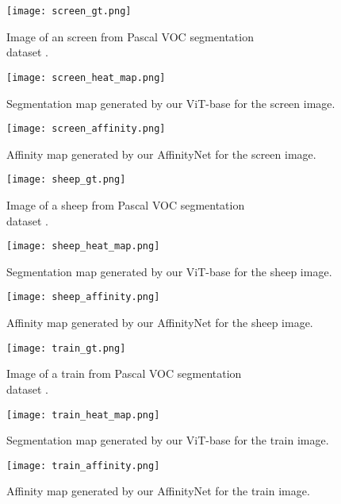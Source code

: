 \documentclass{article}
\begin{document}
\begin{figure}[H]
  \texttt{[image: screen\_gt.png]}
  \caption{Image of an screen from Pascal VOC segmentation \\dataset \cite{ahn2018learning}.}
  \label{fig:screen_gt}
\endminipage\hfill
{}
  \texttt{[image: screen\_heat\_map.png]}
  \caption{Segmentation map generated by our ViT-base for the screen image.}
  \label{fig:screen_map}
\endminipage\hfill
{}%
  \texttt{[image: screen\_affinity.png]}
  \caption{Affinity map generated by our AffinityNet for the screen image.}
  \label{fig:screen_aff}
\endminipage
\end{figure}

\begin{figure}[H]
  \texttt{[image: sheep\_gt.png]}
  \caption{Image of a sheep from Pascal VOC segmentation \\dataset \cite{ahn2018learning}.}
  \label{fig:sheep_gt}
\endminipage\hfill
{}
  \texttt{[image: sheep\_heat\_map.png]}
  \caption{Segmentation map generated by our ViT-base for the sheep image.}
  \label{fig:sheep_heat_map}
\endminipage\hfill
{}%
  \texttt{[image: sheep\_affinity.png]}
  \caption{Affinity map generated by our AffinityNet for the sheep image.}
  \label{fig:sheep_aff}
\endminipage
\end{figure}

\begin{figure}[H]
  \texttt{[image: train\_gt.png]}
  \caption{Image of a train from Pascal VOC segmentation \\dataset \cite{ahn2018learning}.}
  \label{fig:train_gt}
\endminipage\hfill
{}
  \texttt{[image: train\_heat\_map.png]}
  \caption{Segmentation map generated by our ViT-base for the train image.}
  \label{fig:train_heat_map}
\endminipage\hfill
{}%
  \texttt{[image: train\_affinity.png]}
  \caption{Affinity map generated by our AffinityNet for the train image.}
  \label{fig:train_aff}
\endminipage
\end{figure}

\newpage



\end{document}
